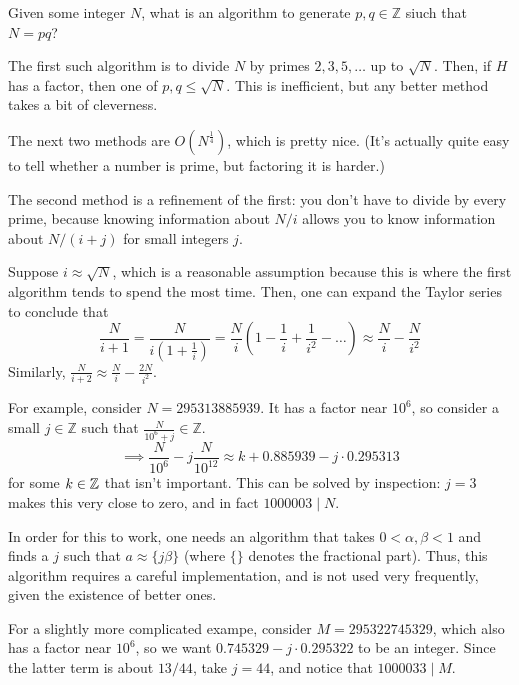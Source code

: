 %
Given some integer $N$, what is an algorithm to generate $p,q\in\mathbb{Z}$ siuch that $N = pq$?

The first such algorithm is to divide $N$ by primes $2,3,5,\dots$ up to $\sqrt{N}$. Then, if $H$ has a factor, then one of $p,q \le \sqrt{N}$. This is inefficient, but any better method takes a bit of cleverness.

The next two methods are $O(N^{\frac{1}{4}})$, which is pretty nice. (It's actually quite easy to tell whether a number is prime, but factoring it is harder.)

The second method is a refinement of the first: you don't have to divide by every prime, because knowing information about $N/i$ allows you to know information about $N/(i+j)$ for small integers $j$.

Suppose $i \approx \sqrt{N}$, which is a reasonable assumption because this is where the first algorithm tends to spend the most time. Then, one can expand the Taylor series to conclude that
\[\frac{N}{i+1} = \frac{N}{i(1+\frac{1}{i})} = \frac{N}{i}\left(1-\frac{1}{i} +\frac{1}{i^2}-\dots\right) \approx \frac{N}{i} -\frac{N}{i^2}\]
Similarly, $\frac{N}{i+2} \approx \frac{N}{i} -\frac{2N}{i^2}$.

For example, consider $N = 295313885939$. It has a factor near $10^6$, so consider a small $j\in\mathbb{Z}$ such that $\frac{N}{10^6 + j}\in\mathbb{Z}$.
\[\implies\frac{N}{10^6} - j\frac{N}{10^{12}} \approx k + 0.885939 - j\cdot0.295313\]
for some $k\in\mathbb{Z}$ that isn't important. This can be solved by inspection: $j = 3$ makes this very close to zero, and in fact $1000003 \mid N$.

In order for this to work, one needs an algorithm that takes $0<\alpha,\beta<1$ and finds a $j$ such that $a\approx \{j\beta\}$ (where $\{\}$ denotes the fractional part). Thus, this algorithm requires a careful implementation, and is not used very frequently, given the existence of better ones.

For a slightly more complicated exampe, consider $M = 295322745329$, which also has a factor near $10^6$, so we want $0.745329 - j\cdot 0.295322$ to be an integer. Since the latter term is about $13/44$, take $j = 44$, and notice that $1000033 \mid M$.


